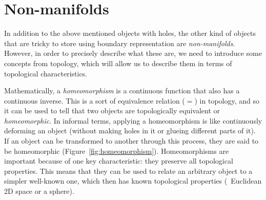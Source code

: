\section{Non-manifolds}

In addition to the above mentioned objects with holes, the other kind of objects that are tricky to store using boundary representation are \emph{non-manifolds}.
However, in order to precisely describe what these are, we need to introduce some concepts from topology, which will allow us to describe them in terms of topological characteristics.

Mathematically, a \emph{homeomorphism} is a continuous function that also has a continuous inverse.
This is a sort of equivalence relation (\(=\)) in topology, and so it can be used to tell that two objects are topologically equivalent or \emph{homeomorphic}.
In informal terms, applying a homeomorphism is like continuously deforming an object (without making holes in it or glueing different parts of it).
If an object can be transformed to another through this process, they are said to be homeomorphic (Figure~\ref{fig:homeomorphism}).
Homeomorphisms are important because of one key characteristic: they preserve all topological properties.
This means that they can be used to relate an arbitrary object to a simpler well-known one, which then has known topological properties (\eg\ Euclidean 2D space or a sphere).

